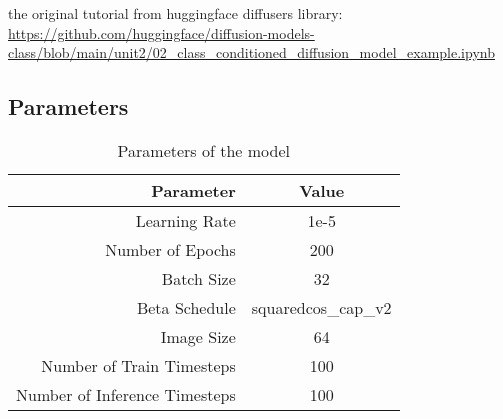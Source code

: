 the original tutorial from huggingface diffusers library: \\
\url{https://github.com/huggingface/diffusion-models-class/blob/main/unit2/02_class_conditioned_diffusion_model_example.ipynb}

\subsection{Parameters}
\begin{table}[H]
    \centering
    \begin{tabular}{|r|c|}
        \hline
        \textbf{Parameter} & \textbf{Value} \\
        \hline
        Learning Rate & 1e-5 \\
        \hline
        Number of Epochs & 200 \\
        \hline
        Batch Size & 32 \\
        \hline
        Beta Schedule & squaredcos\_cap\_v2 \\
        \hline
        Image Size & 64 \\
        \hline
        Number of Train Timesteps & 100 \\
        \hline
        Number of Inference Timesteps & 100 \\
        \hline
    \end{tabular}
    \caption{Parameters of the model}
    \label{tab:parameters}
\end{table}



